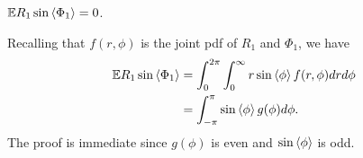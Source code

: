 \documentclass[journal]{IEEEtran}
\begin{document}
\begin{lemma}\label{lem:expectImRfracpart}
${\mathbb E} R_1 \sin\left\langle \Phi_1 \right\rangle = 0$.
\end{lemma}
\begin{IEEEproof}
Recalling that $f(r,\phi)$ is the joint pdf of $R_1$ and $\Phi_1$, we have
\begin{align*}
{\mathbb E} R_1 \sin\left\langle \Phi_1 \right\rangle &= \int_{0}^{2\pi} \int_{0}^\infty r \sin\left\langle \phi \right\rangle f(r,\phi) dr d\phi \\
&= \int_{-\pi}^{\pi} \sin\left\langle \phi \right\rangle g(\phi) d\phi.
\end{align*}
The proof is immediate since $g(\phi)$ is even and $\sin\left\langle \phi \right\rangle$ is odd.
\end{IEEEproof}
\end{document}
